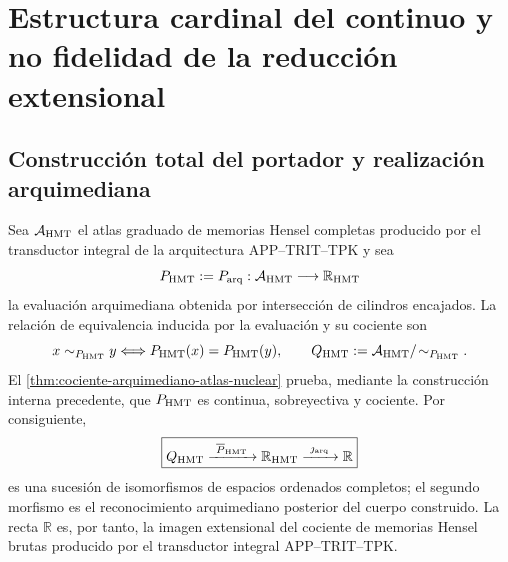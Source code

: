 \section{Estructura cardinal del continuo y no fidelidad de la reducci\'on extensional}
\label{sec:estatuto-cardinal-zfc}

\subsection{Construcci\'on total del portador y realizaci\'on arquimediana}

Sea \(\mathcal A_{\rm HMT}\) el atlas graduado de memorias Hensel completas
producido por el transductor integral de la arquitectura APP--TRIT--TPK y sea
\begin{equation}
 P_{\rm HMT}:=P_{\rm arq}:
 \mathcal A_{\rm HMT}\longrightarrow\mathbb R_{\rm HMT}
 \label{eq:evaluacion-hmt-cardinal}
\end{equation}
la evaluaci\'on arquimediana obtenida por intersecci\'on de cilindros
encajados. La relaci\'on de equivalencia inducida por la evaluaci\'on y su
cociente son
\begin{equation}
 x\sim_{P_{\rm HMT}}y
 \Longleftrightarrow P_{\rm HMT}(x)=P_{\rm HMT}(y),
 \qquad
 Q_{\rm HMT}:=\mathcal A_{\rm HMT}/\!\sim_{P_{\rm HMT}}.
 \label{eq:quotient-enriquecido-cardinal-section}
\end{equation}
El \cref{thm:cociente-arquimediano-atlas-nuclear} prueba, mediante la
construcci\'on interna precedente, que \(P_{\rm HMT}\) es continua, sobreyectiva y
cociente. Por consiguiente,
\begin{equation}
 \boxed{
 Q_{\rm HMT}\xrightarrow{\ \overline P_{\rm HMT}\ }\mathbb R_{\rm HMT}
 \xrightarrow{\ \jmath_{\rm arq}\ }\mathbb R
 }
 \label{eq:cardinal-cociente-hmt}
\end{equation}
es una sucesi\'on de isomorfismos de espacios ordenados completos; el segundo
morfismo es el reconocimiento arquimediano posterior del cuerpo construido.
La recta \(\mathbb R\) es, por tanto, la imagen extensional del cociente de
memorias Hensel brutas producido por el transductor integral
APP--TRIT--TPK.

